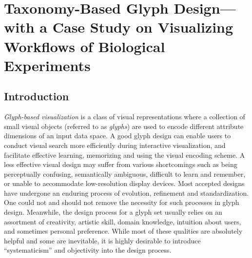 \chapter{Taxonomy-Based Glyph Design---with a Case Study on Visualizing Workflows of Biological Experiments}










\section{Introduction}
\label{sec:Introduction}
\emph{Glyph-based visualization} is a class of visual representations where a collection of small visual objects (referred to as \emph{glyphs}) are used to encode different attribute dimensions of an input data space.
A good glyph design can enable users to conduct visual search more efficiently during interactive visualization, and facilitate effective learning, memorizing and using the visual encoding scheme.
A less effective visual design may suffer from various shortcomings such as being perceptually confusing, semantically ambiguous, difficult to learn and remember, or unable to accommodate low-resolution display devices.
Most accepted designs have undergone an enduring process of evolution, refinement and standardization.
One could not and should not remove the necessity for such processes in glyph design.
Meanwhile, the design process for a glyph set usually relies on an assortment of creativity, artistic skill, domain knowledge, intuition about users, and sometimes personal preference.
While most of these qualities are absolutely helpful and some are inevitable, it is highly desirable to introduce ``systematicism'' and objectivity into the design process.

